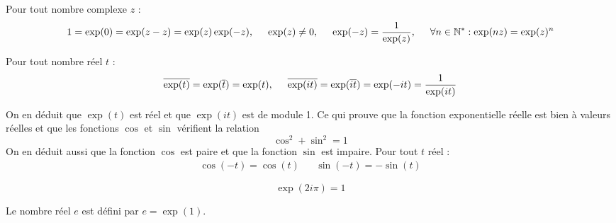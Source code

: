 \begin{propn}[Conséquences de P1.] Pour tout nombre complexe $z$ :
\begin{displaymath}
 1 = \exp (0) = \exp(z -z) = \exp(z) \exp(-z),\hspace{0.5cm} \exp(z)\neq 0,\hspace{0.5cm} \exp(-z) = \frac{1}{\exp(z)},
 \hspace{0.5cm} \forall n\in \mathbb{N}^*: \exp(nz) = \exp(z)^n 
\end{displaymath}
\end{propn}

\begin{propn}[Conséquence de P2.] Pour tout nombre réel $t$ :
\begin{displaymath}
 \overline{\exp(t)} = \exp(\overline{t}) = \exp (t), \hspace{0.5cm}
 \overline{\exp(it)} = \exp(\overline{it}) = \exp (-it) = \dfrac{1}{\exp(it)} 
\end{displaymath}
\end{propn}
On en déduit que $\exp(t)$ est réel et que $\exp(it)$ est de module 1. Ce qui prouve que la fonction exponentielle réelle est bien à valeurs réelles et que les fonctions $\cos$ et $\sin$ vérifient la relation  
\begin{displaymath}
 \cos ^2 + \sin ^2 = 1
\end{displaymath}
On en déduit aussi que la fonction $\cos$ est paire et que la fonction $\sin$ est impaire. Pour tout $t$ réel :
\begin{align*}
 \cos(-t)=\cos(t) & & \sin(-t)=-\sin(t)
\end{align*}

\begin{propn}[Conséquence de P3]
 \[
  \exp(2i\pi) = 1
 \]

\end{propn}


\begin{defi}[Nombre $e$] 
  Le nombre réel $e$ est défini par $e=\exp(1)$.
\end{defi}


